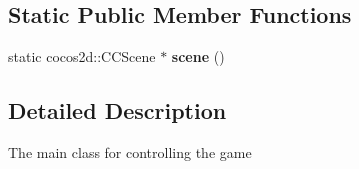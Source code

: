 \subsection*{Static Public Member Functions}
\begin{DoxyCompactItemize}
\item 
\hypertarget{class_j_g___main___game_aacf1b844ebba39f8d75959b592557f26}{static cocos2d\-::\-C\-C\-Scene $\ast$ {\bfseries scene} ()}\label{class_j_g___main___game_aacf1b844ebba39f8d75959b592557f26}

\end{DoxyCompactItemize}


\subsection{Detailed Description}
The main class for controlling the game 

